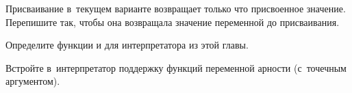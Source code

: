 \begin{exercise}\label{assignment/ex:previous-value}
Присваивание в~текущем варианте возвращает только что присвоенное значение.
Перепишите  так, чтобы она возвращала значение переменной до
присваивания.
\end{exercise}

\begin{exercise}\label{assignment/ex:apply/cc}
Определите функции  и  для интерпретатора из этой главы.
\end{exercise}

\begin{exercise}\label{assignment/ex:dotted}
Встройте в~интерпретатор поддержку функций переменной арности (с~точечным
аргументом).
\end{exercise}
